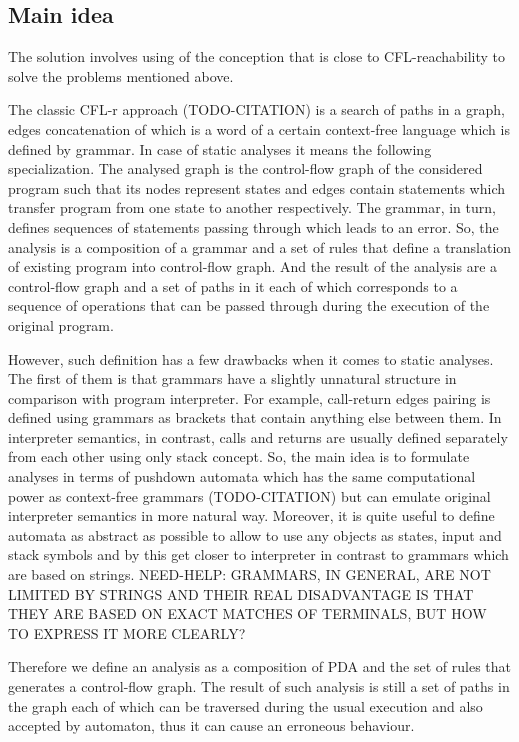 \newcommand{\CS}{C\nolinebreak\hspace{-.05em}\raisebox{.4ex}{\scriptsize\bf \#}}

\subsection{Main idea}

The solution involves using of the conception that is close to CFL-reachability to solve the problems mentioned above.

The classic CFL-r approach (TODO-CITATION) is a search of paths in a graph, edges concatenation of which is a word of a certain context-free language which is defined by grammar.
In case of static analyses it means the following specialization.
The analysed graph is the control-flow graph of the considered program such that its nodes represent states and edges contain statements which transfer program from one state to another respectively.
The grammar, in turn, defines sequences of statements passing through which leads to an error.
So, the analysis is a composition of a grammar and a set of rules that define a translation of existing program into control-flow graph.
And the result of the analysis are a control-flow graph and a set of paths in it each of which corresponds to a sequence of operations that can be passed through during the execution of the original program.

However, such definition has a few drawbacks when it comes to static analyses.
The first of them is that grammars have a slightly unnatural structure in comparison with program interpreter.
For example, call-return edges pairing is defined using grammars as brackets that contain anything else between them.
In interpreter semantics, in contrast, calls and returns are usually defined separately from each other using only stack concept.
So, the main idea is to formulate analyses in terms of pushdown automata which has the same computational power as context-free grammars (TODO-CITATION) but can emulate original interpreter semantics in more natural way.
Moreover, it is quite useful to define automata as abstract as possible to allow to use any objects as states, input and stack symbols and by this get closer to interpreter in contrast to grammars which are based on strings.
NEED-HELP: GRAMMARS, IN GENERAL, ARE NOT LIMITED BY STRINGS AND THEIR REAL DISADVANTAGE IS THAT THEY ARE BASED ON EXACT MATCHES OF TERMINALS, BUT HOW TO EXPRESS IT MORE CLEARLY?

Therefore we define an analysis as a composition of PDA and the set of rules that generates a control-flow graph.
The result of such analysis is still a set of paths in the graph each of which can be traversed during the usual execution and also accepted by automaton, thus it can cause an erroneous behaviour.

